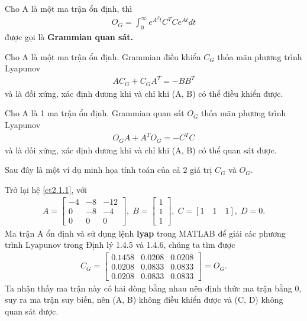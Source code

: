 \begin{definition}
Cho A là một ma trận ổn định, thì
\begin{align}
    O_G = \int_{0}^{\infty}e^{A^{T}t}C^{T}Ce^{At}dt 
\end{align}
được gọi là \textbf{Grammian quan sát.}
\end{definition}
\begin{theorem}\label{dly2.4.3}
Cho A là một ma trận ổn định. Grammian điều khiển $C_G$ thỏa mãn phương trình Lyapunov
\begin{align}
    AC_G + C_GA^{T} = -BB^{T}
\end{align}
và là đối xứng, xác định dương khi và chỉ khi (A, B) có thể điều khiển được.
\end{theorem}
\begin{theorem}\label{dly2.4.4}
Cho A là 1 ma trận ổn định. Grammian quan sát $O_G$ thỏa mãn phương trình Lyapunov
\begin{align}
    O_GA + A^{T}O_G = -C^{T}C
\end{align}
và là đối xứng, xác định dương khi và chỉ khi (A, B) có thể quan sát được.
\end{theorem}
Sau đây là một ví dụ minh họa tính toán của cả 2 giá trị $C_G$ và $O_G$.
\begin{example}
Trở lại hệ \eqref{ct2.1.1}, với 
\begin{align*}
    A = \begin{bmatrix}
        -4 & -8 & -12\\
        0 & -8 & -4\\
        0 & 0 & 0
    \end{bmatrix}, \; B = \begin{bmatrix}
        1\\
        1\\
        1
    \end{bmatrix}, \;  C = [1 \quad 1 \quad 1], \; D = 0.
\end{align*}
Ma trận A ổn định và sử dụng lệnh \textbf{lyap} trong  MATLAB để giải các phương trình Lyapunov trong Định lý 1.4.5 và 1.4.6, chúng ta tìm được
\begin{align*}
    C_G = \begin{bmatrix}
        0.1458 & 0.0208 & 0.0208\\
        0.0208 & 0.0833 & 0.0833\\
        0.0208 & 0.0833 & 0.0833
    \end{bmatrix} = O_G.
\end{align*}
Ta nhận thấy ma trận này có hai dòng bằng nhau nên định thức ma trận bằng 0, suy ra ma trận suy biến, nên (A, B) không điều khiển được và (C, D) không quan sát được.
\end{example}

